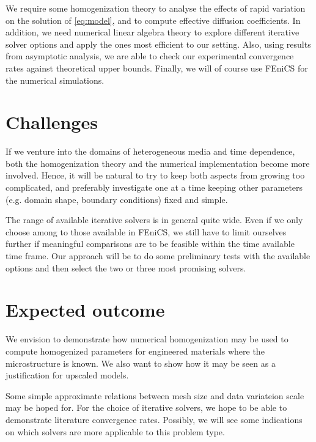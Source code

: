 \documentclass{article}
\begin{document}
We require some homogenization theory to analyse the effects of rapid variation on the solution of \eqref{eq:model}, and to compute effective diffusion coefficients. 
In addition, we need numerical linear algebra theory to explore different iterative solver options and apply the ones most efficient to our setting. 
Also, using results from asymptotic analysis, we are able to check our experimental convergence rates against theoretical upper bounds. Finally, we will of course use FEniCS for the numerical simulations.

\section{Challenges}
\label{sec:challenges}
If we venture into the domains of heterogeneous media and time dependence, both the homogenization theory and the numerical implementation become more involved. Hence, it will be natural to try to keep both aspects from growing too complicated, and preferably investigate one at a time keeping other parameters (e.g. domain shape, boundary conditions) fixed and simple.

The range of available iterative solvers is in general quite wide. Even if we only choose among to those available in FEniCS, we still have to limit ourselves further if meaningful comparisons are to be feasible within the time available time frame. Our approach will be to do some preliminary tests with the available options and then select the two or three most promising solvers.
\section{Expected outcome}
\label{sec:expected_outcome}
We envision to demonstrate how numerical homogenization may be used to compute homogenized parameters for engineered materials where the microstructure is known. We also want to show how it may be seen as a justification for upscaled models. 
 
Some simple approximate relations between mesh size and data variateion scale may be hoped for. For the choice of iterative solvers, we hope to be able to demonstrate literature convergence rates. Possibly, we will see some indications on which solvers are more applicable to this problem type.
\end{document}
